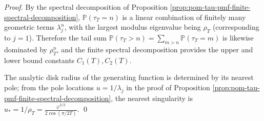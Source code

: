 \begin{proof}
By the spectral decomposition of Proposition \ref{prop:pom-tau-pmf-finite-spectral-decomposition},
\(
\mathbb{P}(\tau_T=n)
\)
is a linear combination of finitely many geometric terms \( \lambda_j^n \), with the largest modulus eigenvalue being \(\rho_T\) (corresponding to \(j=1\)).
Therefore the tail sum \(\mathbb{P}(\tau_T>n)=\sum_{m>n}\mathbb{P}(\tau_T=m)\) is likewise dominated by \(\rho_T^{n}\), and the finite spectral decomposition provides the upper and lower bound constants \(C_1(T),C_2(T)\).
\par
The analytic disk radius of the generating function is determined by its nearest pole; from the pole locations \(u=1/\lambda_j\) in the proof of Proposition \ref{prop:pom-tau-pmf-finite-spectral-decomposition}, the nearest singularity is \(u_*=1/\rho_T=\frac{\varphi^{3/2}}{2\cos(\pi/2T)}\). \qed
\end{proof}
\endinput



